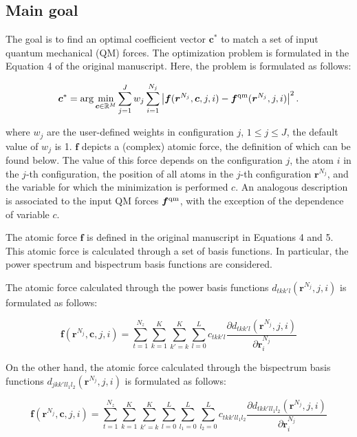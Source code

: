 \documentclass[12pt]{article}
\begin{document}
\subsection{Main goal}

The goal is to find an optimal coefficient vector $\bm c^*$ to match a set of input quantum mechanical (QM) forces. The optimization problem is formulated in the Equation 4 of the original manuscript. Here, the problem is formulated as follows:

\begin{equation}
\bm c^* = \arg \min_{\bm c \in \mathbb{R}^M } \sum_{j=1}^J w_j \sum_{i=1}^{N_j}  \left|\bm f(\bm {r}^{N_j}, \bm c, j, i) - \bm f^{\rm qm}(\bm r^{N_j}, j, i) \right|^2.
\label{eq:min1}
\end{equation}

where $w_j$ are the user-defined weights in configuration $j$, $1 \le j \le J$, the default value of $w_j$ is 1. $\bm f$  depicts a (complex) atomic force, the definition of which can be found below. The value of this force depends on the configuration $j$, the atom $i$ in the $j$-th configuration, the position of all atoms in the $j$-th configuration $\bm {r}^{N_j}$, and the variable for which the minimization is performed $c$. An analogous description is associated to the input QM forces $\bm f^{\rm qm}$, with the exception of the dependence of variable $c$.

The atomic force $\bm f$ is defined in the original manuscript in Equations 4 and 5. This atomic force is calculated through a set of basis functions. In particular, the power spectrum  and bispectrum basis functions are considered.

The atomic force calculated through the power basis functions $d_{tkk'l}(\bm r^{N_j}, j, i)$ is formulated as follows:

\begin{equation}
    \bm f(\bm {r}^{N_j}, \bm c, j, i) = 
    \sum_{t=1}^{N_z}
    \sum_{k=1}^K
    \sum_{k'=k}^{K}
    \sum_{l=0}^L
    c_{tkk'l}
    \frac{\partial d_{tkk'l}(\bm r^{N_j}, j, i)}{\partial \bm r^{N_j}_i}
    \label{eq:force}
\end{equation}


On the other hand, the atomic force calculated through the bispectrum basis functions $d_{jkk'l{l_1}{l_2}}(\bm r^{N_j}, j, i)$ is formulated as follows:

\begin{equation}
    \bm f(\bm {r}^{N_j}, \bm c, j, i) = 
    \sum_{t=1}^{N_z}
    \sum_{k=1}^K
    \sum_{k'=k}^{K}
    \sum_{l=0}^L
    \sum_{l_1=0}^L
    \sum_{l_2=0}^L
    c_{tkk'l{l_1}{l_2}}
    \frac{\partial d_{tkk'l{l_1}{l_2}}(\bm r^{N_j}, j, i)}{\partial \bm r^{N_j}_i}
    \label{eq:force}
\end{equation}
\end{document}
